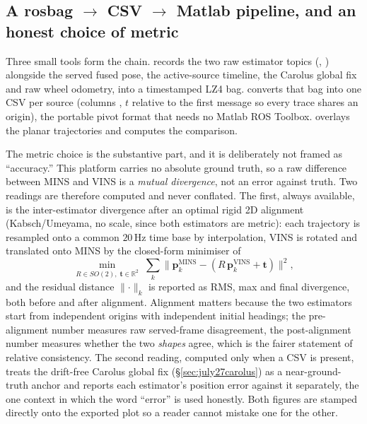 \subsection{A rosbag $\rightarrow$ CSV $\rightarrow$ Matlab pipeline, and an
honest choice of metric}
\label{sec:july27pipeline}
Three small tools form the chain. 
records the two raw estimator topics (,
) alongside the served fused pose, the active-source
timeline, the Carolus global fix and raw wheel odometry, into a timestamped
LZ4 bag.  converts that bag into one CSV per
source (columns , $t$ relative to the
first message so every trace shares an origin), the portable pivot format
that needs no Matlab ROS Toolbox.  overlays
the planar trajectories and computes the comparison.

The metric choice is the substantive part, and it is deliberately not framed
as ``accuracy.'' This platform carries no absolute ground truth, so a raw
difference between MINS and VINS is a \emph{mutual divergence}, not an error
against truth. Two readings are therefore computed and never conflated. The
first, always available, is the inter-estimator divergence after an optimal
rigid 2D alignment (Kabsch/Umeyama, no scale, since both estimators are
metric): each trajectory is resampled onto a common $20$\,Hz time base by
interpolation, VINS is rotated and translated onto MINS by the closed-form
minimiser of
\begin{equation}
\min_{R\in SO(2),\;\mathbf{t}\in\mathbb{R}^2}\;
\sum_{k}\bigl\lVert \mathbf{p}^{\text{MINS}}_k - (R\,\mathbf{p}^{\text{VINS}}_k + \mathbf{t})\bigr\rVert^2 ,
\label{eq:kabsch}
\end{equation}
and the residual distance $\lVert\cdot\rVert_k$ is reported as RMS, max and
final divergence, both before and after alignment. Alignment matters because
the two estimators start from independent origins with independent initial
headings; the pre-alignment number measures raw served-frame disagreement,
the post-alignment number measures whether the two \emph{shapes} agree, which
is the fairer statement of relative consistency. The second reading, computed
only when a  CSV is present, treats the drift-free Carolus
global fix (\S\ref{sec:july27carolus}) as a near-ground-truth anchor and
reports each estimator's position error against it separately, the one
context in which the word ``error'' is used honestly. Both figures are
stamped directly onto the exported plot so a reader cannot mistake one for
the other.

